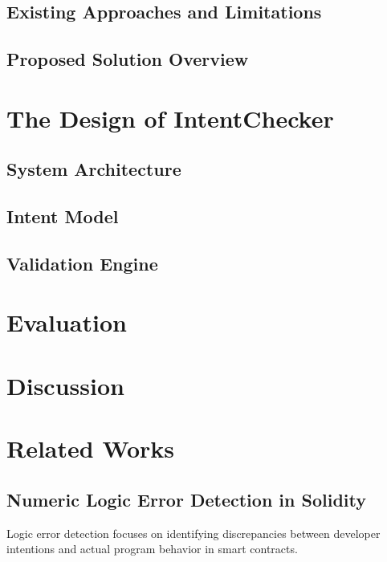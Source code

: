 \documentclass[pdflatex,sn-basic]{sn-jnl}%
\theoremstyle{thmstyleone}%
\theoremstyle{thmstyletwo}%
\theoremstyle{thmstylethree}%
\begin{document}
\subsection{Existing Approaches and Limitations}
\subsection{Proposed Solution Overview}
\section{The Design of IntentChecker}\label{sec:design}
\subsection{System Architecture}
\subsection{Intent Model}
\subsection{Validation Engine}
\section{Evaluation}\label{sec:evaluation}
\section{Discussion}\label{sec:discussion}
\section{Related Works}\label{sec:related}
\subsection{Numeric Logic Error Detection in Solidity}
Logic error detection focuses on identifying discrepancies between developer intentions and actual program behavior in smart contracts.
\end{document}
